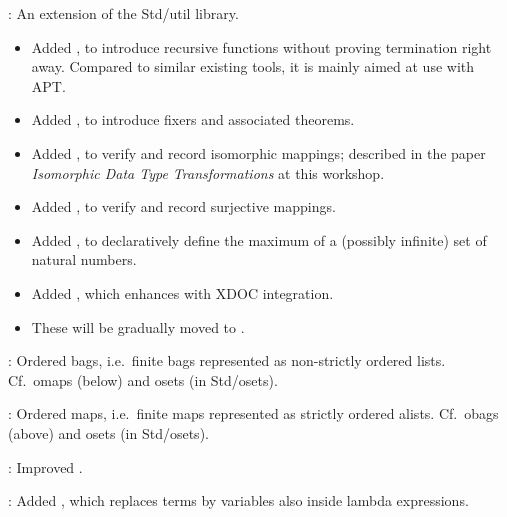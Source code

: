 \begin{frame}

\newlibtitle

:
An extension of the Std/util library.
\begin{itemize}
\item
Added ,
to introduce recursive functions without proving termination right away.
Compared to similar existing tools, it is mainly aimed at use with APT.
\item
Added , to introduce fixers and associated theorems.
\item
Added , to verify and record isomorphic mappings;
described in the paper
\textit{Isomorphic Data Type Transformations} at this workshop.
\item
Added , to verify and record surjective mappings.
\item
Added ,
to declaratively define the maximum of
a (possibly infinite) set of natural numbers.
\item
Added , which enhances  with XDOC integration.
\item
These will be gradually moved to .
\end{itemize}

\end{frame}


\begin{frame}

\newlibtitle

:
Ordered bags, i.e.\ finite bags represented as non-strictly ordered lists.
Cf.\ omaps (below) and osets (in Std/osets).

\separation

:
Ordered maps, i.e.\ finite maps represented as strictly ordered alists.
Cf.\ obags (above) and osets (in Std/osets).

\separation

:
Improved .

\separation

:
Added ,
which replaces terms by variables also inside lambda expressions.

\end{frame}

